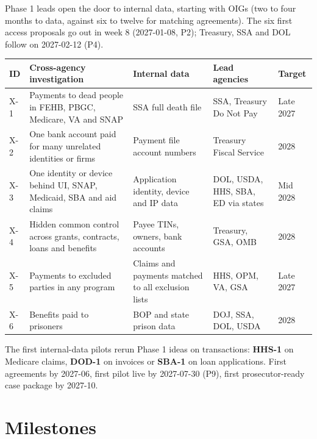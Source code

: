 \documentclass[letterpaper,11pt]{article}
\begin{document}
Phase 1 leads open the door to internal data, starting with OIGs (two to
four months to data, against six to twelve for matching agreements). The
six first access proposals go out in week 8 (2027-01-08, P2); Treasury,
SSA and DOL follow on 2027-02-12 (P4).

\begingroup\small\setlength{\tabcolsep}{4pt}\renewcommand{\arraystretch}{1.25}
\begin{longtable}[l]{@{}l>{\raggedright\arraybackslash}p{}>{\raggedright\arraybackslash}p{}>{\raggedright\arraybackslash}p{}l@{}}
\rowcolor{coolblack}\leavevmode\color{white}\bfseries ID & \leavevmode\color{white}\bfseries Cross-agency investigation & \leavevmode\color{white}\bfseries Internal data & \leavevmode\color{white}\bfseries Lead agencies & \leavevmode\color{white}\bfseries Target \\
\endhead
X-1 & Payments to dead people in FEHB, PBGC, Medicare, VA and SNAP & SSA full death file & SSA, Treasury Do Not Pay & Late 2027 \\
X-2 & One bank account paid for many unrelated identities or firms & Payment file account numbers & Treasury Fiscal Service & 2028 \\
X-3 & One identity or device behind UI, SNAP, Medicaid, SBA and aid claims & Application identity, device and IP data & DOL, USDA, HHS, SBA, ED via states & Mid 2028 \\
X-4 & Hidden common control across grants, contracts, loans and benefits & Payee TINs, owners, bank accounts & Treasury, GSA, OMB & 2028 \\
X-5 & Payments to excluded parties in any program & Claims and payments matched to all exclusion lists & HHS, OPM, VA, GSA & Late 2027 \\
X-6 & Benefits paid to prisoners & BOP and state prison data & DOJ, SSA, DOL, USDA & 2028 \\
\end{longtable}\endgroup

The first internal-data pilots rerun Phase 1 ideas on transactions:
\textbf{HHS-1} on Medicare claims, \textbf{DOD-1} on invoices or
\textbf{SBA-1} on loan applications. First agreements by 2027-06, first
pilot live by 2027-07-30 (P9), first prosecutor-ready case package by
2027-10.

\hypertarget{milestones}{%
\section{Milestones}\label{milestones}}
\end{document}
